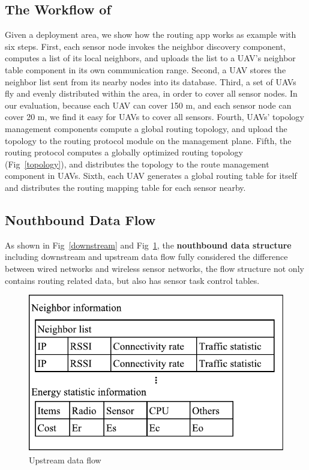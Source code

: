 \subsection{The Workflow of {\sdn}}
Given a deployment area, we show how the routing app works as example with six steps. First, each sensor node invokes the neighbor discovery component, computes a list of its local neighbors, and uploads the list to a UAV's neighbor table component in its own communication range. Second, a UAV stores the neighbor list sent from its nearby nodes into its database. Third, a set of UAVs fly and evenly distributed within the area, in order to cover all sensor nodes. In our evaluation, because each UAV can cover 150 m, and
 each sensor node can cover 20 m, we find it easy for UAVs to cover all sensors. Fourth, UAVs' topology management components compute a global routing topology, and upload the topology to the routing protocol module on the management plane. Fifth, the routing protocol computes a globally optimized routing topology (Fig~\ref{topology}), and distributes the topology to the route management component in UAVs. Sixth, each UAV generates a global routing table for itself and distributes the routing mapping table for each sensor nearby.

\subsection{Nouthbound Data Flow}

As shown in Fig~\ref{downstream} and Fig~\ref{upstream}, the \textbf{nouthbound data structure} including downstream and upstream data flow fully considered the difference between wired networks and wireless sensor networks, the flow structure not only contains routing related data, but also has sensor task control tables.

\begin{figure}[htbp]
	\centering
	\includegraphics[width=.6\columnwidth]{Figure/upstream}
	\caption{Upstream data flow}
	\label{upstream}
\end{figure}

